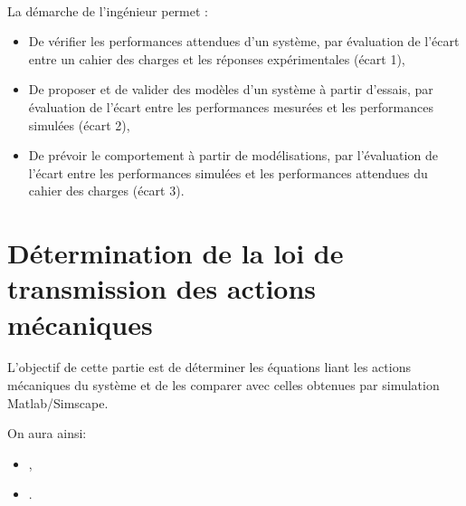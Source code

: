 


 \\

\graphicspath{{../../img/}}
\begin{center}
\def\svgwidth{\columnwidth}

\end{center}

La démarche de l’ingénieur permet :
\begin{itemize}
 \item De vérifier les performances attendues d’un système, par évaluation de l’écart entre un cahier des charges et les réponses expérimentales (écart 1),
 \item De proposer et de valider des modèles d’un système à partir d’essais, par évaluation de l’écart entre les performances mesurées et les performances simulées (écart 2),
 \item De prévoir le comportement à partir de modélisations, par l’évaluation de l’écart entre les performances simulées et les performances attendues du cahier des charges (écart 3).
\end{itemize}


\newpage

\section{Détermination de la loi de transmission des actions mécaniques}

L'objectif de cette partie est de déterminer les équations liant les actions mécaniques du système \systemes et de les comparer avec celles obtenues par simulation Matlab/Simscape.

On aura ainsi:
\begin{itemize}
 \item \entree,
 \item \sortie.
\end{itemize}

